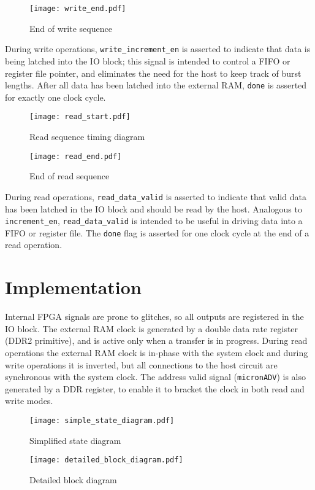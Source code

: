 \documentclass[12pt]{article}
\begin{document}
\begin{figure}[h]
	\texttt{[image: write\_end.pdf]}
	\caption{End of write sequence}
\end{figure}

During write operations, \texttt{write\_increment\_en} is asserted to indicate that data is being latched into the IO block; this signal is intended to control a FIFO or register file pointer, and eliminates the need for the host to keep track of burst lengths. After all data has been latched into the external RAM, \texttt{done} is asserted for exactly one clock cycle.

\pagebreak

\begin{figure}
	\texttt{[image: read\_start.pdf]}
	\caption{Read sequence timing diagram}
\end{figure}

\begin{figure}[h]
	\texttt{[image: read\_end.pdf]}
	\caption{End of read sequence}
\end{figure}

During read operations, \texttt{read\_data\_valid} is asserted to indicate that valid data has been latched in the IO block and should be read by the host.  Analogous to \texttt{increment\_en}, \texttt{read\_data\_valid} is intended to be useful in driving data into a FIFO or register file. The \texttt{done} flag is asserted for one clock cycle at the end of a read operation.

\pagebreak

\section{Implementation}

Internal FPGA signals are prone to glitches, so all outputs are registered in the IO block.  The external RAM clock is generated by a double data rate register (DDR2 primitive), and is active only when a transfer is in progress. During read operations the external RAM clock is in-phase with the system clock and during write operations it is inverted, but all connections to the host circuit are synchronous with the system clock. The address valid signal (\texttt{micronADV}) is also generated by a DDR register, to enable it to bracket the clock in both read and write modes.

\vspace{\baselineskip}

\begin{figure}[hb]
	\centering
	\texttt{[image: simple\_state\_diagram.pdf]}
	\captionsetup{singlelinecheck=on, skip=5pt}
	\caption{Simplified state diagram}
\end{figure}

\begin{figure}
	\texttt{[image: detailed\_block\_diagram.pdf]}
	\caption{Detailed block diagram}
\end{figure}
\end{document}
